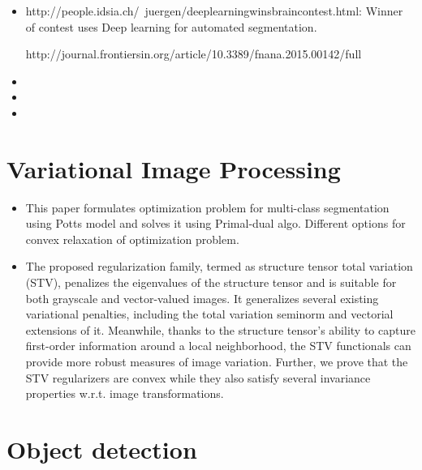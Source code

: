 \documentclass{article}
\begin{document}
\begin{itemize}
\item {}
http://people.idsia.ch/~juergen/deeplearningwinsbraincontest.html: Winner of contest uses Deep learning for automated segmentation.

http://journal.frontiersin.org/article/10.3389/fnana.2015.00142/full




\item {}

\item {}

\item {}

\end{itemize}




\section{Variational Image Processing}

\begin{itemize}

\item {}
This paper formulates optimization problem for multi-class segmentation using Potts model and solves it using Primal-dual algo. Different options for convex relaxation of optimization problem.


\item {}
The proposed regularization family, termed as structure tensor total variation (STV), penalizes the eigenvalues of the structure tensor and is suitable for both grayscale and vector-valued images. It generalizes several existing variational penalties, including the total variation seminorm and vectorial extensions of it. Meanwhile, thanks to the structure tensor's ability to capture first-order information around a local neighborhood, the STV functionals can provide more robust measures of image variation. Further, we prove that the STV regularizers are convex while they also satisfy several invariance properties w.r.t. image transformations.


\end{itemize}



\section{Object detection}
\end{document}
